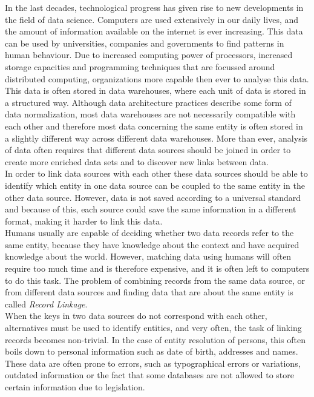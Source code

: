In the last decades, technological progress has given rise to new developments in the field of data science. Computers are used extensively in our daily lives, and the amount of information available on the internet is ever increasing. This data can be used by universities, companies and governments to find patterns in human behaviour. Due to increased computing power of processors, increased storage capacities and programming techniques that are focussed around distributed computing, organizations more capable then ever to analyse this data. \\
This data is often stored in data warehouses, where each unit of data is stored in a structured way. Although data architecture practices describe some form of data normalization, most data warehouses are not necessarily compatible with each other and therefore most data concerning the same entity is often stored in a slightly different way across different data warehouses. More than ever, analysis of data often requires that different data sources should be joined in order to create more enriched data sets and to discover new links between data. \\

In order to link data sources with each other these data sources should be able to identify which entity in one data source can be coupled to the same entity in the other data source. However, data is not saved according to a universal standard and because of this, each source could save the same information in a different format, making it harder to link this data. \\ Humans usually are capable of deciding whether two data records refer to the same entity, because they have knowledge about the context and have acquired knowledge about the world.
However, matching data using humans will often require too much time and is therefore expensive, and it is often left to computers to do this task. The problem of combining records from the same data source, or from different data sources and finding data that are about the same entity is called \textit{Record Linkage}. \\

When the keys in two data sources do not correspond with each other, alternatives must be used to identify entities, and very often, the task of linking records becomes non-trivial. In the case of entity resolution of persons, this often boils down to personal information such as date of birth, addresses and names. These data are often prone to errors, such as typographical errors or variations, outdated information or the fact that some databases are not allowed to store certain information due to legislation. \\

